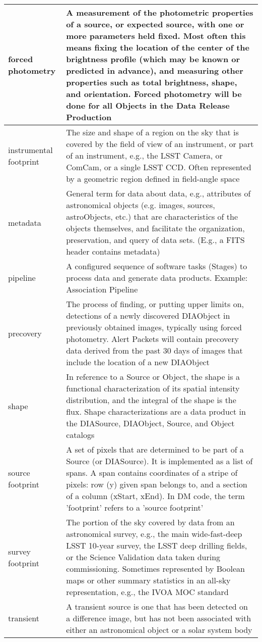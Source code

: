 \begin{longtable}{|p{}|p{}|}
forced photometry & A measurement of the photometric properties of a source, or expected source, with one or more parameters held fixed. Most often this means fixing the location of the center of the brightness profile (which may be known or predicted in advance), and measuring other properties such as total brightness, \gls{shape}, and orientation. Forced photometry will be done for all Objects in the \gls{Data Release} Production \\\hline
instrumental \gls{footprint} & The size and \gls{shape} of a region on the sky that is covered by the field of view of an instrument, or part of an instrument, e.g., the \gls{LSST} \gls{Camera}, or ComCam, or a single \gls{LSST} \gls{CCD}.  Often represented by a geometric region defined in field-angle space \\\hline
metadata & General term for data about data, e.g., attributes of astronomical objects (e.g. images, sources, astroObjects, etc.) that are characteristics of the objects themselves, and facilitate the organization, preservation, and query of data sets. (E.g., a \gls{FITS} header contains \gls{metadata}) \\\hline
pipeline & A configured sequence of software tasks (Stages) to process data and generate data products. Example: \gls{Association Pipeline} \\\hline
precovery & The process of finding, or putting upper limits on, detections of a newly discovered \gls{DIAObject} in previously obtained images, typically using \gls{forced photometry}. \gls{Alert} Packets will contain \gls{precovery} data derived from the past 30 days of images that include the location of a new \gls{DIAObject} \\\hline
shape & In reference to a \gls{Source} or \gls{Object}, the \gls{shape} is a functional characterization of its spatial intensity distribution, and the integral of the \gls{shape} is the \gls{flux}. Shape characterizations are a data product in the \gls{DIASource}, \gls{DIAObject}, \gls{Source}, and \gls{Object} catalogs \\\hline
source \gls{footprint} & A set of pixels that are determined to be part of a \gls{Source} (or \gls{DIASource}). It is implemented as a list of spans. A span contains coordinates of a stripe of pixels: row (y) given span belongs to, and a section of a column (xStart, xEnd). In \gls{DM} code, the term 'footprint' refers to a 'source \gls{footprint}' \\\hline
survey \gls{footprint} & The portion of the sky covered by data from an astronomical survey, e.g., the main wide-fast-deep \gls{LSST} 10-year survey, the \gls{LSST} deep drilling fields, or the Science \gls{Validation} data taken during commissioning.  Sometimes represented by Boolean maps or other summary statistics in an all-sky representation, e.g., the \gls{IVOA} \gls{MOC} standard \\\hline
transient & A \gls{transient} source is one that has been detected on a difference image, but has not been associated with either an \gls{astronomical object} or a solar system body \\\hline
\end{longtable}

